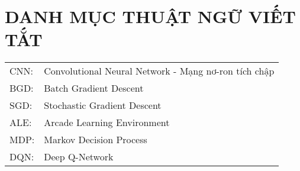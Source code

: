 \chapter*{DANH MỤC THUẬT NGỮ VIẾT TẮT}

\begin{tabular}{ l l }
	CNN: & Convolutional Neural Network - Mạng nơ-ron tích chập\\
	BGD: & Batch Gradient Descent\\
	SGD: & Stochastic Gradient Descent\\
	ALE: & Arcade Learning Environment\\
	MDP: & Markov Decision Process\\
	DQN: & Deep Q-Network
\end{tabular}